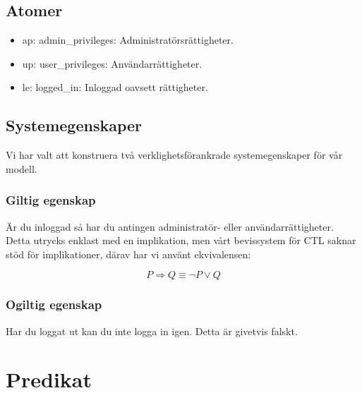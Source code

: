 \documentclass{article}
\begin{document}
  \subsection{Atomer}

  \begin{itemize}

    \item ap: admin\_privileges: Administratörsrättigheter.
    \item up: user\_privileges: Användarrättigheter.
    \item le: logged\_in: Inloggad oavsett rättigheter.

  \end{itemize}


  \newpage

  \subsection{Systemegenskaper}
  Vi har valt att konstruera två verklighetsförankrade systemegenskaper för vår
  modell. 

  \subsubsection{Giltig egenskap}
  Är du inloggad så har du antingen administratör- eller användarrättigheter.
  Detta utrycks enklast med en implikation, men vårt bevissystem för CTL saknar
  stöd för implikationer, därav har vi använt ekvivalensen:

  $$
  P \Rightarrow Q \equiv \neg P \lor Q
  $$

  \begin{figure}[h!]
    
  \end{figure}


  \subsubsection{Ogiltig egenskap}
  Har du loggat ut kan du inte logga in igen. Detta är givetvis falskt.

  \begin{figure}[h!]
    
  \end{figure}

  \newpage

  \section{Predikat}
\end{document}
